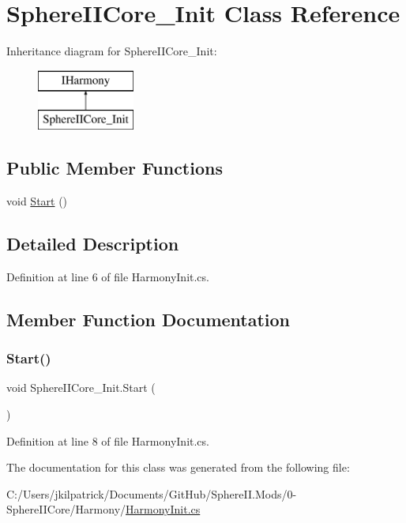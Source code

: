 \hypertarget{class_sphere_i_i_core___init}{}\section{Sphere\+I\+I\+Core\+\_\+\+Init Class Reference}
\label{class_sphere_i_i_core___init}
Inheritance diagram for Sphere\+I\+I\+Core\+\_\+\+Init\+:\begin{figure}[H]
\begin{center}
\leavevmode
\includegraphics[height=2.000000cm]{class_sphere_i_i_core___init}
\end{center}
\end{figure}
\subsection*{Public Member Functions}
\begin{DoxyCompactItemize}
\item 
void \mbox{\hyperlink{class_sphere_i_i_core___init_a87ad6a825d11618eb54f78fcfbfbda64}{Start}} ()
\end{DoxyCompactItemize}


\subsection{Detailed Description}


Definition at line 6 of file Harmony\+Init.\+cs.



\subsection{Member Function Documentation}
\mbox{\label{class_sphere_i_i_core___init_a87ad6a825d11618eb54f78fcfbfbda64}} 
\subsubsection{\texorpdfstring{Start()}{Start()}}
{\footnotesize\ttfamily void Sphere\+I\+I\+Core\+\_\+\+Init.\+Start (\begin{DoxyParamCaption}{ }\end{DoxyParamCaption})}



Definition at line 8 of file Harmony\+Init.\+cs.



The documentation for this class was generated from the following file\+:\begin{DoxyCompactItemize}
\item 
C\+:/\+Users/jkilpatrick/\+Documents/\+Git\+Hub/\+Sphere\+I\+I.\+Mods/0-\/\+Sphere\+I\+I\+Core/\+Harmony/\mbox{\hyperlink{0-_sphere_i_i_core_2_harmony_2_harmony_init_8cs}{Harmony\+Init.\+cs}}\end{DoxyCompactItemize}
